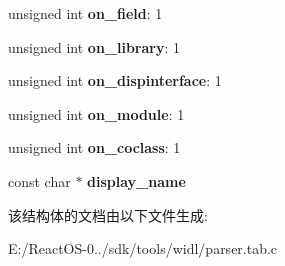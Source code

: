 \begin{DoxyCompactItemize}
\item 
\mbox{\label{structallowed__attr_a92c5d5f0ead4cae7c86124fe0db059da}} 
unsigned int {\bfseries on\+\_\+field}\+: 1
\item 
\mbox{\label{structallowed__attr_aabc194fe56f85ee3a4d710cc42187c8b}} 
unsigned int {\bfseries on\+\_\+library}\+: 1
\item 
\mbox{\label{structallowed__attr_a13363f1201721e8b4f088bcb4e093164}} 
unsigned int {\bfseries on\+\_\+dispinterface}\+: 1
\item 
\mbox{\label{structallowed__attr_a7065cb4db10e49964ce08cea74207cee}} 
unsigned int {\bfseries on\+\_\+module}\+: 1
\item 
\mbox{\label{structallowed__attr_a0623ffd499b559cef21ab0226fdd2947}} 
unsigned int {\bfseries on\+\_\+coclass}\+: 1
\item 
\mbox{\label{structallowed__attr_a431ea6cfca9d21af6faf2d6b7b28125d}} 
const char $\ast$ {\bfseries display\+\_\+name}
\end{DoxyCompactItemize}


该结构体的文档由以下文件生成\+:\begin{DoxyCompactItemize}
\item 
E\+:/\+React\+O\+S-\/0../sdk/tools/widl/parser.\+tab.\+c\end{DoxyCompactItemize}
